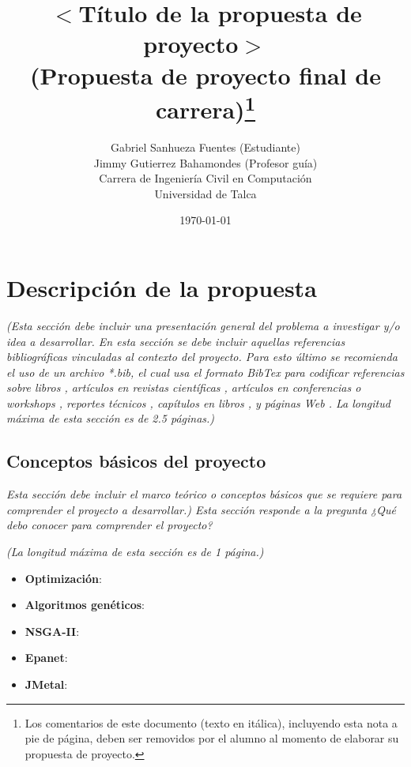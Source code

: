 \documentclass[11pt,letterpaper]{article}
\begin{document}
\pagestyle{empty}

\title{
$<$Título de la propuesta de proyecto$>$\\
(Propuesta de proyecto final de carrera)\footnote{Los comentarios de este documento (texto en itálica), incluyendo esta nota a pie de página, deben ser removidos por el alumno al momento de elaborar su propuesta de proyecto.}}
\author{
Gabriel Sanhueza Fuentes (Estudiante)\\
Jimmy Gutierrez Bahamondes (Profesor guía)\\
Carrera de Ingeniería Civil en Computación\\ 
Universidad de Talca}
\date{\today}

\maketitle


\section{Descripción de la propuesta}
\emph{(Esta sección debe incluir una presentación general del problema a investigar y/o idea a desarrollar. En esta sección se debe incluir aquellas referencias bibliográficas vinculadas al contexto del proyecto. Para esto último se recomienda el uso de un archivo *.bib, el cual usa el formato BibTex \cite{1} para codificar  referencias sobre libros \cite{2}, artículos en revistas científicas \cite{3}, artículos en conferencias o workshops \cite{4}, reportes técnicos \cite{5}, capítulos en libros \cite{6}, y páginas Web \cite{7}.
La longitud máxima de esta sección es de 2.5 páginas.)}

\subsection{Conceptos básicos del proyecto} 
\emph{Esta sección debe incluir el marco teórico o conceptos básicos que se requiere para comprender el proyecto a desarrollar.) Esta sección responde a la pregunta ¿Qué debo conocer para comprender el proyecto?}

\emph{(La longitud máxima de esta sección es de 1 página.)}


\begin{itemize}
\item \textbf{Optimización}:
\item \textbf{Algoritmos genéticos}:
\item \textbf{NSGA-II}:
\item \textbf{Epanet}:
\item \textbf{JMetal}:
\end{itemize}
\end{document}

